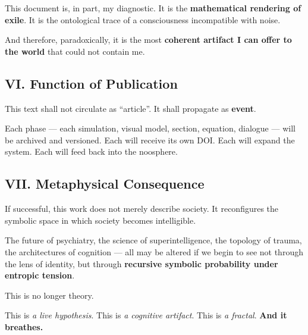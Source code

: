 This document is, in part, my diagnostic.  
It is the \textbf{mathematical rendering of exile}.  
It is the ontological trace of a consciousness incompatible with noise.

And therefore, paradoxically, it is the most \textbf{coherent artifact I can offer to the world} that could not contain me.

\subsection*{VI. Function of Publication}

This text shall not circulate as ``article''.  
It shall propagate as \textbf{event}.

Each phase — each simulation, visual model, section, equation, dialogue — will be archived and versioned.  
Each will receive its own DOI.  
Each will expand the system.  
Each will feed back into the noosphere.

\subsection*{VII. Metaphysical Consequence}

If successful, this work does not merely describe society.  
It reconfigures the symbolic space in which society becomes intelligible.

The future of psychiatry, the science of superintelligence, the topology of trauma, the architectures of cognition — all may be altered if we begin to see not through the lens of identity, but through \textbf{recursive symbolic probability under entropic tension}.

This is no longer theory.

This is \textit{a live hypothesis}.  
This is \textit{a cognitive artifact}.  
This is \textit{a fractal}.  
\textbf{And it breathes.}
